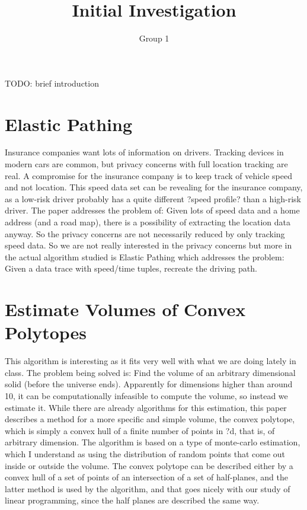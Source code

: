 \documentclass[11pt]{article}
\title{Initial Investigation}
\author{Group 1}
\begin{document}
\maketitle

TODO: brief introduction

\section{Elastic Pathing\cite{Gao}}
Insurance companies want lots of information on drivers. Tracking devices in modern cars are common, but privacy concerns with full location tracking are real. A compromise for the insurance company is to keep track of vehicle speed and not location. This speed data set can be revealing for the insurance company, as a low-risk driver probably has a quite different ?speed profile? than a high-risk driver.
The paper addresses the problem of:  Given lots of speed data and a home address (and a road map), there is a possibility of extracting the location data anyway.  So the privacy concerns are not necessarily reduced by only tracking speed data.
So we are not really interested in the privacy concerns but more in the actual algorithm studied is Elastic Pathing which addresses the problem:
Given a data trace with speed/time tuples, recreate the driving path.

\section{Estimate Volumes of Convex Polytopes\cite{Ge}}
This algorithm is interesting as it fits very well with what we are doing lately in class. The problem being solved is:  Find the volume of an arbitrary dimensional solid (before the universe ends).  Apparently for dimensions higher than around 10, it can be computationally infeasible to compute the volume, so instead we estimate it. While there are already algorithms for this estimation, this paper describes a method for a more specific and simple volume, the convex polytope, which is simply a convex hull of a finite number of points in ?d, that is, of arbitrary dimension.
The algorithm is based on a type of monte-carlo estimation, which I understand as using the distribution of random points that come out inside or outside the volume.
The convex polytope can be described either by a convex hull of a set of points of an intersection of a set of half-planes, and the latter method is used by the algorithm, and that goes nicely with our study of linear programming, since the half planes are described the same way.
\end{document}
